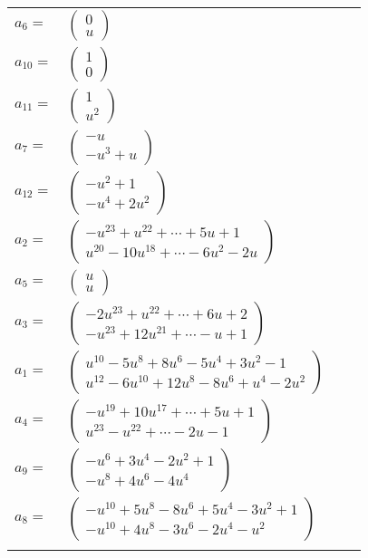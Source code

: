 \documentclass[1p]{elsarticle_modified}
\theoremstyle{definition}
\begin{document}
\begin{tabular}{m{7pt} m{180pt} m{7pt} m{180pt} }
\flushright $a_{6}=$&$\begin{pmatrix}0\\u\end{pmatrix}$ \\
\flushright $a_{10}=$&$\begin{pmatrix}1\\0\end{pmatrix}$ \\
\flushright $a_{11}=$&$\begin{pmatrix}1\\u^2\end{pmatrix}$ \\
\flushright $a_{7}=$&$\begin{pmatrix}- u\\- u^3+u\end{pmatrix}$ \\
\flushright $a_{12}=$&$\begin{pmatrix}- u^2+1\\- u^4+2 u^2\end{pmatrix}$ \\
\flushright $a_{2}=$&$\begin{pmatrix}- u^{23}+u^{22}+\cdots+5 u+1\\u^{20}-10 u^{18}+\cdots-6 u^2-2 u\end{pmatrix}$ \\
\flushright $a_{5}=$&$\begin{pmatrix}u\\u\end{pmatrix}$ \\
\flushright $a_{3}=$&$\begin{pmatrix}-2 u^{23}+u^{22}+\cdots+6 u+2\\- u^{23}+12 u^{21}+\cdots- u+1\end{pmatrix}$ \\
\flushright $a_{1}=$&$\begin{pmatrix}u^{10}-5 u^8+8 u^6-5 u^4+3 u^2-1\\u^{12}-6 u^{10}+12 u^8-8 u^6+u^4-2 u^2\end{pmatrix}$ \\
\flushright $a_{4}=$&$\begin{pmatrix}- u^{19}+10 u^{17}+\cdots+5 u+1\\u^{23}- u^{22}+\cdots-2 u-1\end{pmatrix}$ \\
\flushright $a_{9}=$&$\begin{pmatrix}- u^6+3 u^4-2 u^2+1\\- u^8+4 u^6-4 u^4\end{pmatrix}$ \\
\flushright $a_{8}=$&$\begin{pmatrix}- u^{10}+5 u^8-8 u^6+5 u^4-3 u^2+1\\- u^{10}+4 u^8-3 u^6-2 u^4- u^2\end{pmatrix}$\\&\end{tabular}
\end{document}
